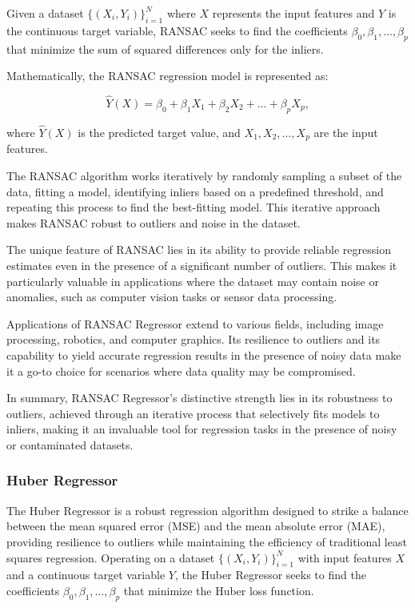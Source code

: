 \documentclass[twocolumn]{article}
\begin{document}
Given a dataset \(\{(X_i, Y_i)\}_{i=1}^{N}\) where \(X\) represents the input features and \(Y\) is the continuous target variable, RANSAC seeks to find the coefficients \(\beta_0, \beta_1, \ldots, \beta_p\) that minimize the sum of squared differences only for the inliers.

Mathematically, the RANSAC regression model is represented as:

\[ \hat{Y}(X) = \beta_0 + \beta_1 X_1 + \beta_2 X_2 + \ldots + \beta_p X_p, \]

where \(\hat{Y}(X)\) is the predicted target value, and \(X_1, X_2, \ldots, X_p\) are the input features.

The RANSAC algorithm works iteratively by randomly sampling a subset of the data, fitting a model, identifying inliers based on a predefined threshold, and repeating this process to find the best-fitting model. This iterative approach makes RANSAC robust to outliers and noise in the dataset.

The unique feature of RANSAC lies in its ability to provide reliable regression estimates even in the presence of a significant number of outliers. This makes it particularly valuable in applications where the dataset may contain noise or anomalies, such as computer vision tasks or sensor data processing.

Applications of RANSAC Regressor extend to various fields, including image processing, robotics, and computer graphics. Its resilience to outliers and its capability to yield accurate regression results in the presence of noisy data make it a go-to choice for scenarios where data quality may be compromised.

In summary, RANSAC Regressor's distinctive strength lies in its robustness to outliers, achieved through an iterative process that selectively fits models to inliers, making it an invaluable tool for regression tasks in the presence of noisy or contaminated datasets.

		\subsubsection{Huber Regressor}
The Huber Regressor is a robust regression algorithm designed to strike a balance between the mean squared error (MSE) and the mean absolute error (MAE), providing resilience to outliers while maintaining the efficiency of traditional least squares regression. Operating on a dataset \(\{(X_i, Y_i)\}_{i=1}^{N}\) with input features \(X\) and a continuous target variable \(Y\), the Huber Regressor seeks to find the coefficients \(\beta_0, \beta_1, \ldots, \beta_p\) that minimize the Huber loss function.
\end{document}
